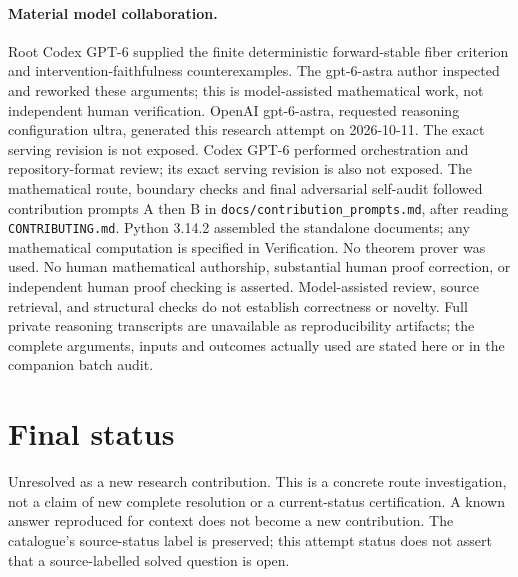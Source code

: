 \documentclass[11pt]{article}
\begin{document}
\paragraph{Material model collaboration.} Root Codex GPT-6 supplied the finite deterministic forward-stable fiber criterion and intervention-faithfulness counterexamples. The gpt-6-astra author inspected and reworked these arguments; this is model-assisted mathematical work, not independent human verification.
OpenAI gpt-6-astra, requested reasoning configuration ultra, generated this research
attempt on 2026-10-11. The exact serving revision is not exposed. Codex GPT-6
performed orchestration and repository-format review; its exact serving revision
is also not exposed. The mathematical route, boundary checks and final adversarial
self-audit followed contribution prompts A then B in
\texttt{docs/contribution\_prompts.md}, after reading \texttt{CONTRIBUTING.md}.
Python 3.14.2 assembled the standalone documents; any mathematical computation is
specified in Verification. No theorem prover was used. No human mathematical
authorship, substantial human proof correction, or independent human proof checking
is asserted. Model-assisted review, source retrieval, and structural checks do not
establish correctness or novelty. Full private reasoning transcripts are unavailable
as reproducibility artifacts; the complete arguments, inputs and outcomes actually
used are stated here or in the companion batch audit.
\section{Final status}
Unresolved as a new research contribution. This is a concrete route investigation,
not a claim of new complete resolution or a current-status certification. A known
answer reproduced for context does not become a new contribution. The catalogue's
source-status label is preserved; this attempt status does not assert that a
source-labelled solved question is open.
\end{document}
